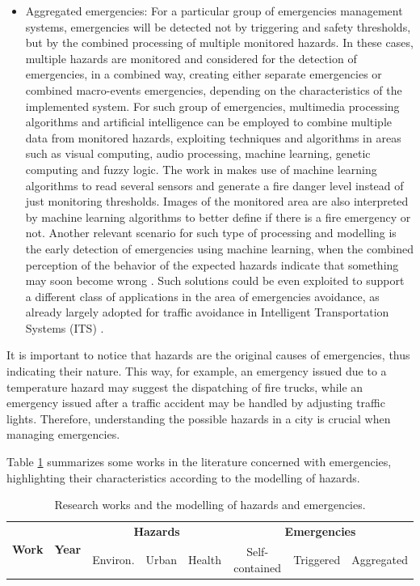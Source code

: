 \begin{refsection}
\begin{itemize}
    \item Aggregated emergencies: For a particular group of emergencies management systems, emergencies will be detected not by triggering and safety thresholds, but by the combined processing of multiple monitored hazards. In these cases, multiple hazards are monitored and considered for the detection of emergencies, in a combined way, creating either separate emergencies or combined macro-events emergencies, depending on the characteristics of the implemented system. For such group of emergencies, multimedia processing algorithms and artificial intelligence can be employed to combine multiple data from monitored hazards, exploiting techniques and algorithms in areas such as visual computing, audio processing, machine learning, genetic computing and fuzzy logic. The work in \cite{SultanMahmud2017} makes use of machine learning algorithms to read several sensors and generate a fire danger level instead of just monitoring thresholds. Images of the monitored area are also interpreted by machine learning algorithms to better define if there is a fire emergency or not. Another relevant scenario for such type of processing and modelling is the early detection of emergencies using machine learning, when the combined perception of the behavior of the expected hazards indicate that something may soon become wrong \cite{machine1}. Such solutions could be even exploited to support a different class of applications in the area of emergencies avoidance, as already largely adopted for traffic avoidance in Intelligent Transportation Systems (ITS) \cite{machine2}.
\end{itemize}

It is important to notice that hazards are the original causes of emergencies, thus indicating their nature. This way, for example, an emergency issued due to a temperature hazard may suggest the dispatching of fire trucks, while an emergency issued after a traffic accident may be handled by adjusting traffic lights. Therefore, understanding the possible hazards in a city is crucial when managing emergencies. 

Table \ref{Tab:hazards} summarizes some works in the literature concerned with emergencies, highlighting their characteristics according to the modelling of hazards.

\begin{table}
\centering
\caption{Research works and the modelling of hazards and emergencies.}
\label{Tab:hazards}
\begin{tabular}{|c|c|c|c|c|c|c|c|}
    \multirow{2}{*}{\textbf{Work}} & \multirow{2}{*}{\textbf{Year}} & 
    \multicolumn{3}{|c|}{\textbf{Hazards}} & \multicolumn{3}{|c|}{\textbf{Emergencies}}\\
    \cline{3-8}
    & & Environ. & Urban & Health & Self-contained & Triggered & Aggregated \\ 
    

\end{tabular}
\end{table}
\end{refsection}
